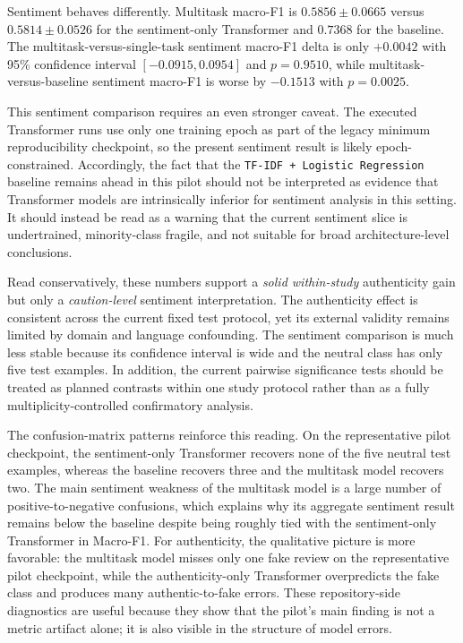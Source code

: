 \documentclass[12pt,a4paper]{article}
\begin{document}
Sentiment behaves differently. Multitask macro-F1 is $0.5856 \pm 0.0665$ versus $0.5814 \pm 0.0526$ for the sentiment-only Transformer and $0.7368$ for the baseline. The multitask-versus-single-task sentiment macro-F1 delta is only $+0.0042$ with 95\% confidence interval $[-0.0915, 0.0954]$ and $p=0.9510$, while multitask-versus-baseline sentiment macro-F1 is worse by $-0.1513$ with $p=0.0025$.

This sentiment comparison requires an even stronger caveat. The executed Transformer runs use only one training epoch as part of the legacy minimum reproducibility checkpoint, so the present sentiment result is likely epoch-constrained. Accordingly, the fact that the \texttt{TF-IDF + Logistic Regression} baseline remains ahead in this pilot should not be interpreted as evidence that Transformer models are intrinsically inferior for sentiment analysis in this setting. It should instead be read as a warning that the current sentiment slice is undertrained, minority-class fragile, and not suitable for broad architecture-level conclusions.

Read conservatively, these numbers support a \emph{solid within-study} authenticity gain but only a \emph{caution-level} sentiment interpretation. The authenticity effect is consistent across the current fixed test protocol, yet its external validity remains limited by domain and language confounding. The sentiment comparison is much less stable because its confidence interval is wide and the neutral class has only five test examples. In addition, the current pairwise significance tests should be treated as planned contrasts within one study protocol rather than as a fully multiplicity-controlled confirmatory analysis.

The confusion-matrix patterns reinforce this reading. On the representative pilot checkpoint, the sentiment-only Transformer recovers none of the five neutral test examples, whereas the baseline recovers three and the multitask model recovers two. The main sentiment weakness of the multitask model is a large number of positive-to-negative confusions, which explains why its aggregate sentiment result remains below the baseline despite being roughly tied with the sentiment-only Transformer in Macro-F1. For authenticity, the qualitative picture is more favorable: the multitask model misses only one fake review on the representative pilot checkpoint, while the authenticity-only Transformer overpredicts the fake class and produces many authentic-to-fake errors. These repository-side diagnostics are useful because they show that the pilot's main finding is not a metric artifact alone; it is also visible in the structure of model errors.
\end{document}
